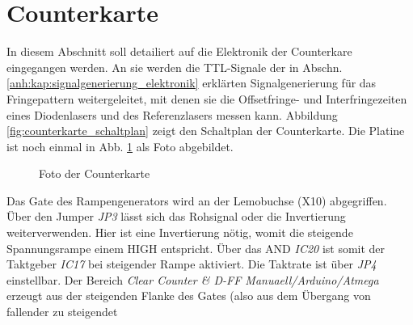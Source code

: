 \section{Counterkarte}\label{anh:sec:counterkarte}
In diesem Abschnitt soll detailiert auf die Elektronik der Counterkare
eingegangen werden. An sie werden die TTL-Signale der in Abschn.
\ref{anh:kap:signalgenerierung_elektronik} erklärten Signalgenerierung für das
Fringepattern weitergeleitet, mit denen sie die Offsetfringe- und
Interfringezeiten eines Diodenlasers und des Referenzlasers messen kann.
Abbildung \ref{fig:counterkarte_schaltplan} zeigt den Schaltplan der
Counterkarte. Die Platine ist noch einmal in Abb.
\ref{fig:counterkarte_foto} als Foto abgebildet.\par
\begin{figure}[h]
 	\centering
	\caption[Counterkarte -
	Foto]{Foto der Counterkarte}\label{fig:counterkarte_foto}
\end{figure}
Das Gate des Rampengenerators wird an der Lemobuchse (X10) abgegriffen.
Über den Jumper \textit{JP3} lässt sich das Rohsignal oder die Invertierung weiterverwenden.
Hier ist eine Invertierung nötig, womit die steigende Spannungsrampe einem HIGH entspricht.
Über das AND \textit{IC20} ist somit der Taktgeber \textit{IC17} bei steigender
Rampe aktiviert. Die Taktrate ist über \textit{JP4} einstellbar. Der Bereich
\textit{Clear Counter \& D-FF Manuaell/Arduino/Atmega} erzeugt aus der
steigenden Flanke des Gates (also aus dem Übergang von fallender zu steigendet
